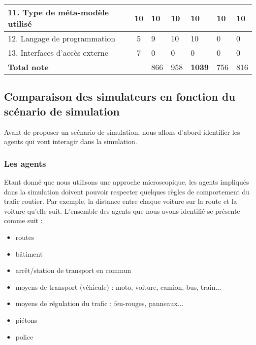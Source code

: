 \begin{table}[!ht]
\begin{center}
\begin{tabular}{|p{3.8cm}|c|p{1.5cm}|p{1.75cm}|p{1.5cm}|p{1.75cm}|p{1.5cm}|}
\\ 
\hline
\footnotesize 11. Type de méta-modèle utilisé  & \footnotesize 10 & \footnotesize 10  & \footnotesize  10 & \footnotesize 10 & \footnotesize 10 & \footnotesize 10
\\ 
\hline
\footnotesize 12. Langage de programmation  & \footnotesize 5 & \footnotesize 9  & \footnotesize 10  & \footnotesize 10 & \footnotesize 0 & \footnotesize 0
\\ 
\hline
\footnotesize 13. Interfaces d’accès externe  & \footnotesize 7 & \footnotesize 0 & \footnotesize  0 & \footnotesize 0 & \footnotesize 0 & \footnotesize 0
\\ 
\hline
\footnotesize \textbf{Total note}  & \footnotesize  & \footnotesize  866 & \footnotesize 958  & \footnotesize \textbf{1039}  & \footnotesize 756 & \footnotesize 816
\\
\hline
\end{tabular}
\end{center}
\end{table}


\subsection{Comparaison des simulateurs en fonction du scénario de simulation}
Avant de proposer un scénario de simulation, nous allons d'abord identifier les agents qui vont interagir dans la simulation. 

\subsubsection{Les agents}
Etant donné que nous utilisons une approche microscopique, les agents impliqués dans la simulation doivent pouvoir respecter quelques règles de comportement du trafic routier. Par exemple, la distance entre chaque voiture sur la route et la voiture qu'elle suit. L'ensemble des agents que nous avons identifié se présente comme suit :
\begin{itemize}
    \item routes
    \item bâtiment
    \item arrêt/station de transport en commun 
    \item moyens de transport (véhicule) : moto, voiture, camion, bus, train...
    \item moyens de régulation du trafic : feu-rouges, panneaux...
    \item piétons
    \item police
\end{itemize}

